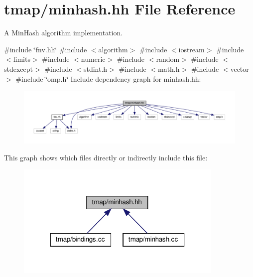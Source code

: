 \hypertarget{minhash_8hh}{}\section{tmap/minhash.hh File Reference}
\label{minhash_8hh}


A Min\+Hash algorithm implementation.  


{\ttfamily \#include \char`\"{}fnv.\+hh\char`\"{}}\newline
{\ttfamily \#include $<$algorithm$>$}\newline
{\ttfamily \#include $<$iostream$>$}\newline
{\ttfamily \#include $<$limits$>$}\newline
{\ttfamily \#include $<$numeric$>$}\newline
{\ttfamily \#include $<$random$>$}\newline
{\ttfamily \#include $<$stdexcept$>$}\newline
{\ttfamily \#include $<$stdint.\+h$>$}\newline
{\ttfamily \#include $<$math.\+h$>$}\newline
{\ttfamily \#include $<$vector$>$}\newline
{\ttfamily \#include \char`\"{}omp.\+h\char`\"{}}\newline
Include dependency graph for minhash.\+hh\+:\nopagebreak
\begin{figure}[H]
\begin{center}
\leavevmode
\includegraphics[width=350pt]{minhash_8hh__incl}
\end{center}
\end{figure}
This graph shows which files directly or indirectly include this file\+:\nopagebreak
\begin{figure}[H]
\begin{center}
\leavevmode
\includegraphics[width=282pt]{minhash_8hh__dep__incl}
\end{center}
\end{figure}
